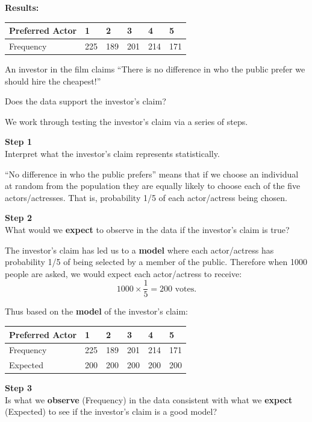 \documentclass[
]{book}
\begin{document}
\textbf{Results:}

\begin{longtable}[]{@{}llllll@{}}
\toprule\noalign{}
Preferred Actor & 1 & 2 & 3 & 4 & 5 \\
\midrule\noalign{}
\endhead
\bottomrule\noalign{}
\endlastfoot
Frequency & 225 & 189 & 201 & 214 & 171 \\
\end{longtable}

An investor in the film claims ``There is no difference in who the public prefer we should hire the cheapest!''

Does the data support the investor's claim?

We work through testing the investor's claim via a series of steps.

{\textbf{Step 1}}\\
Interpret what the investor's claim represents statistically.

``No difference in who the public prefers'' means that if we choose an individual at random from the population they are equally likely to choose each of the five actors/actresses. That is, probability 1/5 of each actor/actress being chosen.

{\textbf{Step 2}}\\
What would we {\textbf{expect}} to observe in the data if the investor's claim is true?

The investor's claim has led us to a {\textbf{model}} where each actor/actress has probability 1/5 of being selected by a member of the public. Therefore when 1000 people are asked, we would expect each actor/actress to receive:\\

\[ 1000 \times \frac{1}{5} = 200 \mbox{ votes}. \]

Thus based on the {\textbf{model}} of the investor's claim:\\

\begin{longtable}[]{@{}llllll@{}}
\toprule\noalign{}
Preferred Actor & 1 & 2 & 3 & 4 & 5 \\
\midrule\noalign{}
\endhead
\bottomrule\noalign{}
\endlastfoot
Frequency & 225 & 189 & 201 & 214 & 171 \\
Expected & 200 & 200 & 200 & 200 & 200 \\
\end{longtable}

{\textbf{Step 3}}\\
Is what we {\textbf{observe}} (Frequency) in the data consistent with what we {\textbf{expect}} (Expected) to see if the investor's claim is a good model?
\end{document}
